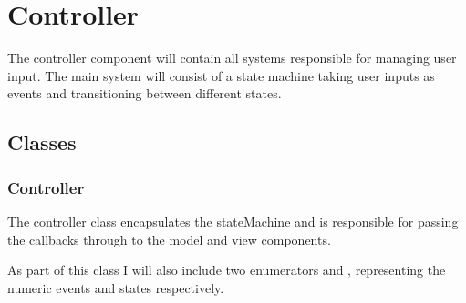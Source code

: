 \section{Controller}

    The controller component will contain all systems responsible for managing user input. The main system will consist of a state machine taking user inputs as events and transitioning between different states.

    \subsection{Classes}

        \subsubsection{Controller}

            The controller class encapsulates the stateMachine and is responsible for passing the callbacks through to the model and view components.

            As part of this class I will also include two enumerators  and , representing the numeric events and states respectively.


